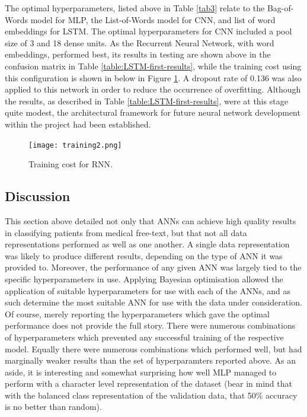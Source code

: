 The optimal hyperparameters, listed above in Table \ref{tab3} relate to the Bag-of-Words model for MLP, the List-of-Words model for CNN, and list of word embeddings for LSTM. The optimal hyperparameters for CNN included a pool size of 3 and 18 dense units. As the Recurrent Neural Network, with word embeddings, performed best, its results in testing are shown above in the confusion matrix in Table \ref{table:LSTM-first-results}, while the training cost using this configuration is shown in below in Figure \ref{fig1}. A dropout rate of 0.136 was also applied to this network in order to reduce the occurrence of overfitting. Although the results, as described in Table \ref{table:LSTM-first-results}, were at this stage quite modest, the architectural framework for future neural network development within the project had been established.



\begin{figure}[htbp]
\centerline{\texttt{[image: training2.png]}}
\caption{Training cost for RNN.}
\label{fig1}
\end{figure}


\subsection{Discussion}


This section above detailed not only that ANNs can achieve high quality results in classifying patients from medical free-text, but that not all data representations performed as well as one another. A single data representation was likely to produce different results, depending on the type of ANN it was provided to. Moreover, the performance of any given ANN was largely tied to the specific hyperparameters in use. Applying Bayesian optimisation allowed the application of suitable hyperparameters for use with each of the ANNs, and as such determine the most suitable ANN for use with the data under consideration. Of course, merely reporting the hyperparameters which gave the optimal performance does not provide the full story. There were numerous combinations of hyperparameters which prevented any successful training of the respective model. Equally there were numerous combinations which performed well, but had marginally weaker results than the set of hyperparamters reported above. As an aside, it is interesting and somewhat surprising how well MLP managed to perform with a character level representation of the dataset (bear in mind that with the balanced class representation of the validation data, that 50\% accuracy is no better than random).

